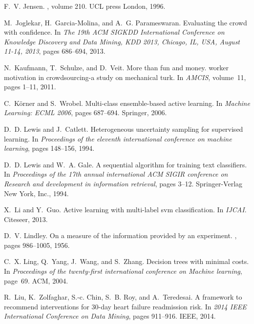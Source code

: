 \documentclass[11pt]{article}
\begin{document}
\begin{thebibliography}{10}
	F.~V. Jensen.
	, volume 210.
	\newblock UCL press London, 1996.
	
	M.~Joglekar, H.~Garcia{-}Molina, and A.~G. Parameswaran.
	\newblock Evaluating the crowd with confidence.
	\newblock In {\em The 19th {ACM} {SIGKDD} International Conference on Knowledge
		Discovery and Data Mining, {KDD} 2013, Chicago, IL, USA, August 11-14, 2013},
	pages 686--694, 2013.
	
	N.~Kaufmann, T.~Schulze, and D.~Veit.
	\newblock More than fun and money. worker motivation in crowdsourcing-a study
	on mechanical turk.
	\newblock In {\em AMCIS}, volume~11, pages 1--11, 2011.
	
	C.~K{\"o}rner and S.~Wrobel.
	\newblock Multi-class ensemble-based active learning.
	\newblock In {\em Machine Learning: ECML 2006}, pages 687--694. Springer, 2006.
	
	D.~D. Lewis and J.~Catlett.
	\newblock Heterogeneous uncertainty sampling for supervised learning.
	\newblock In {\em Proceedings of the eleventh international conference on
		machine learning}, pages 148--156, 1994.
	
	D.~D. Lewis and W.~A. Gale.
	\newblock A sequential algorithm for training text classifiers.
	\newblock In {\em Proceedings of the 17th annual international ACM SIGIR
		conference on Research and development in information retrieval}, pages
	3--12. Springer-Verlag New York, Inc., 1994.
	
	X.~Li and Y.~Guo.
	\newblock Active learning with multi-label svm classification.
	\newblock In {\em IJCAI}. Citeseer, 2013.
	
	D.~V. Lindley.
	\newblock On a measure of the information provided by an experiment.
	, pages 986--1005, 1956.
	
	C.~X. Ling, Q.~Yang, J.~Wang, and S.~Zhang.
	\newblock Decision trees with minimal costs.
	\newblock In {\em Proceedings of the twenty-first international conference on
		Machine learning}, page~69. ACM, 2004.
	
	R.~Liu, K.~Zolfaghar, S.-c. Chin, S.~B. Roy, and A.~Teredesai.
	\newblock A framework to recommend interventions for 30-day heart failure
	readmission risk.
	\newblock In {\em 2014 IEEE International Conference on Data Mining}, pages
	911--916. IEEE, 2014.
	

\end{thebibliography}
\end{document}
